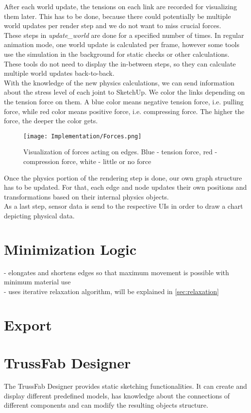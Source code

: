 After each world update, the tensions on each link are recorded for visualizing them later. This has to be done, because there could potentially be multiple world updates per render step and we do not want to miss crucial forces.\\
These steps in \textit{update\_world} are done for a specified number of times. In regular animation mode, one world update is calculated per frame, however some tools use the simulation in the background for static checks or other calculations. These tools do not need to display the in-between steps, so they can calculate multiple world updates back-to-back.\\
With the knowledge of the new physics calculations, we can send information about the stress level of each joint to SketchUp. We color the links depending on the tension force on them. A blue color means negative tension force, i.e. pulling force, while red color means positive force, i.e. compressing force. The higher the force, the deeper the color gets.\\
\begin{figure}[h!]
    \texttt{[image: Implementation/Forces.png]}
    \centering
    \caption{Visualization of forces acting on edges. Blue - tension force, red - compression force, white - little or no force}
    \label{fig:force_visualization}
\end{figure}
Once the physics portion of the rendering step is done, our own graph structure has to be updated. For that, each edge and node updates their own positions and transformations based on their internal physics objects.\\
As a last step, sensor data is send to the respective UIs in order to draw a chart depicting physical data.
\section{Minimization Logic}
- elongates and shortens edges so that maximum movement is possible with minimum material use\\
- uses iterative relaxation algorithm, will be explained in \ref{sec:relaxation}

\section{Export}

\section{TrussFab Designer}
The TrussFab Designer provides static sketching functionalities. It can create and display different predefined models, has knowledge about the connections of different components and can modify the resulting objects structure.


